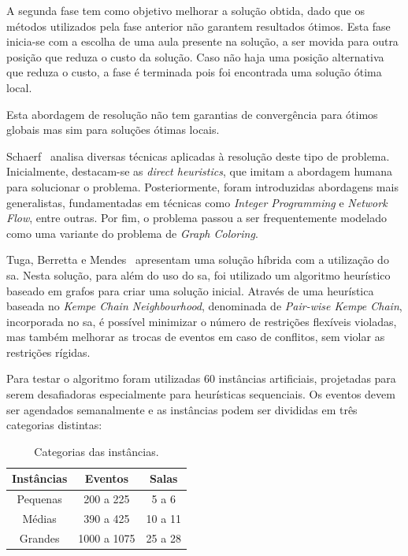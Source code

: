 A segunda fase tem como objetivo melhorar a solução obtida, dado que os métodos utilizados pela fase anterior não garantem resultados ótimos. Esta fase inicia-se com a escolha de uma aula presente na solução, a ser movida para outra posição que reduza o custo da solução. Caso não haja uma posição alternativa que reduza o custo, a fase é terminada pois foi encontrada uma solução ótima local.

Esta abordagem de resolução não tem garantias de convergência para ótimos globais mas sim para soluções ótimas locais. 

Schaerf~\cite{SurveyAutomatedTimetabling-Schaerf-1999} analisa diversas técnicas aplicadas à resolução deste tipo de problema. Inicialmente, destacam-se as \textit{direct heuristics}, que imitam a abordagem humana para solucionar o problema. Posteriormente, foram introduzidas abordagens mais generalistas, fundamentadas em técnicas como \textit{Integer Programming} e \textit{Network Flow}, entre outras. Por fim, o problema passou a ser frequentemente modelado como uma variante do problema de \textit{Graph Coloring}.

Tuga, Berretta e Mendes~\cite{HybridSimulatedAnnealing-Tuga-2007} apresentam uma solução híbrida com a utilização do \gls{sa}. Nesta solução, para além do uso do \gls{sa}, foi utilizado um algoritmo heurístico baseado em grafos para criar uma solução inicial. Através de uma heurística baseada no \textit{Kempe Chain Neighbourhood}, denominada de \textit{Pair-wise Kempe Chain}, incorporada no \gls{sa}, é possível minimizar o número de restrições flexíveis violadas, mas também melhorar as trocas de eventos em caso de conflitos, sem violar as restrições rígidas.

Para testar o algoritmo foram utilizadas 60 instâncias artificiais, projetadas para serem desafiadoras especialmente para heurísticas sequenciais. Os eventos devem ser agendados semanalmente e as instâncias podem ser divididas em três categorias distintas:

{
\setlength{\tabcolsep}{.8em}
\begin{table}[H]
    \centering
    \caption{Categorias das instâncias.}
    \label{tabela:categorias-instancias}
    \begin{tabular}{ccc}
    \toprule
    \textbf{Instâncias} & \textbf{Eventos}     & \textbf{Salas}   \\ \midrule
    Pequenas            & 200 a 225            & 5 a 6            \\
    Médias              & 390 a 425            & 10 a 11          \\
    Grandes             & 1000 a 1075          & 25 a 28          \\
    \bottomrule
    \end{tabular}
\end{table}
}

